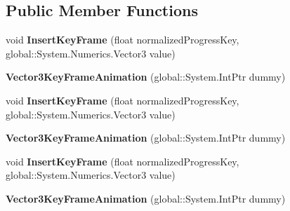 \subsection*{Public Member Functions}
\begin{DoxyCompactItemize}
\item 
\mbox{\label{class_windows_1_1_u_i_1_1_composition_1_1_vector3_key_frame_animation_a9aef830bf8f0a427819998607074969a}} 
void {\bfseries Insert\+Key\+Frame} (float normalized\+Progress\+Key, global\+::\+System.\+Numerics.\+Vector3 value)
\item 
\mbox{\label{class_windows_1_1_u_i_1_1_composition_1_1_vector3_key_frame_animation_aa2d2987cf82d5a743bc61cb07d999e8b}} 
{\bfseries Vector3\+Key\+Frame\+Animation} (global\+::\+System.\+Int\+Ptr dummy)
\item 
\mbox{\label{class_windows_1_1_u_i_1_1_composition_1_1_vector3_key_frame_animation_a9aef830bf8f0a427819998607074969a}} 
void {\bfseries Insert\+Key\+Frame} (float normalized\+Progress\+Key, global\+::\+System.\+Numerics.\+Vector3 value)
\item 
\mbox{\label{class_windows_1_1_u_i_1_1_composition_1_1_vector3_key_frame_animation_aa2d2987cf82d5a743bc61cb07d999e8b}} 
{\bfseries Vector3\+Key\+Frame\+Animation} (global\+::\+System.\+Int\+Ptr dummy)
\item 
\mbox{\label{class_windows_1_1_u_i_1_1_composition_1_1_vector3_key_frame_animation_a9aef830bf8f0a427819998607074969a}} 
void {\bfseries Insert\+Key\+Frame} (float normalized\+Progress\+Key, global\+::\+System.\+Numerics.\+Vector3 value)
\item 
\mbox{\label{class_windows_1_1_u_i_1_1_composition_1_1_vector3_key_frame_animation_aa2d2987cf82d5a743bc61cb07d999e8b}} 
{\bfseries Vector3\+Key\+Frame\+Animation} (global\+::\+System.\+Int\+Ptr dummy)
\item 

\end{DoxyCompactItemize}
